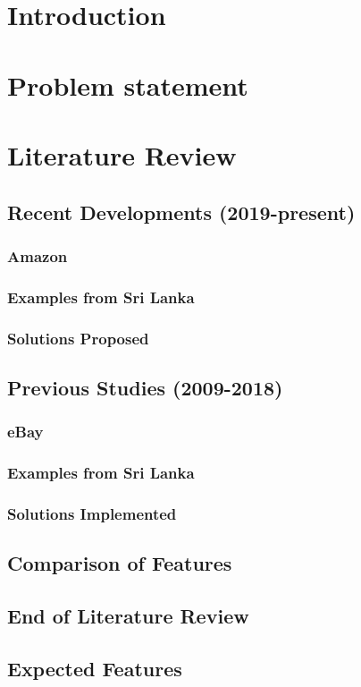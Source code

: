 \documentclass{article}
\begin{document}
\tableofcontents

\section{Introduction}
\section{Problem statement}
\section{Literature Review}
\subsection{Recent Developments (2019-present)}
\subsubsection{Amazon}
\subsubsection{Examples from Sri Lanka}
\subsubsection{Solutions Proposed}
\subsection{Previous Studies (2009-2018)}
\subsubsection{eBay}
\subsubsection{Examples from Sri Lanka}
\subsubsection{Solutions Implemented}
\subsection{Comparison of Features}
\subsection{End of Literature Review}
\subsection{Expected Features}
\end{document}
